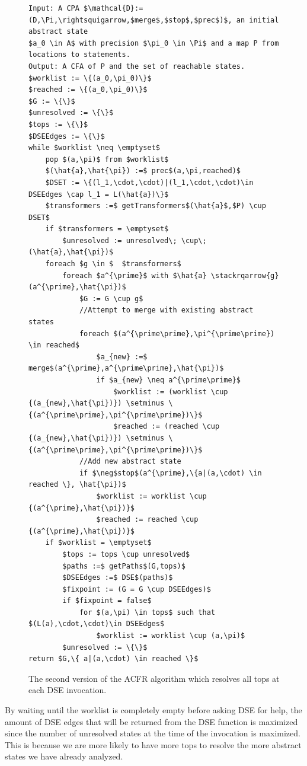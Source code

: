 \documentclass{kththesis}
\newcommand\stackrqarrow[1]{%
    \mathrel{\stackon[2pt]{$\rightsquigarrow$}{$\scriptscriptstyle#1$}}}
\begin{document}
\begin{figure}[htb]
    \centering
\begin{algorithmFrame}
\begin{lstlisting}[style=algorithm]
Input: A CPA $\mathcal{D}:=(D,\Pi,\rightsquigarrow,$merge$,$stop$,$prec$)$, an initial abstract state
$a_0 \in A$ with precision $\pi_0 \in \Pi$ and a map P from locations to statements.
Output: A CFA of P and the set of reachable states.
$worklist := \{(a_0,\pi_0)\}$
$reached := \{(a_0,\pi_0)\}$
$G := \{\}$
$unresolved := \{\}$
$tops := \{\}$
$DSEEdges := \{\}$
while $worklist \neq \emptyset$ 
    pop $(a,\pi)$ from $worklist$
    $(\hat{a},\hat{\pi}) :=$ prec$(a,\pi,reached)$
    $DSET := \{(l_1,\cdot,\cdot)|(l_1,\cdot,\cdot)\in DSEEdges \cap l_1 = L(\hat{a})\}$
    $transformers :=$ getTransformers$(\hat{a}$,$P) \cup DSET$
    if $transformers = \emptyset$
        $unresolved := unresolved\; \cup\; (\hat{a},\hat{\pi})$
    foreach $g \in $  $transformers$ 
        foreach $a^{\prime}$ with $\hat{a} \stackrqarrow{g} (a^{\prime},\hat{\pi})$
            $G := G \cup g$
            //Attempt to merge with existing abstract states
            foreach $(a^{\prime\prime},\pi^{\prime\prime}) \in reached$
                $a_{new} :=$ merge$(a^{\prime},a^{\prime\prime},\hat{\pi})$
                if $a_{new} \neq a^{\prime\prime}$
                    $worklist := (worklist \cup {(a_{new},\hat{\pi})}) \setminus \{(a^{\prime\prime},\pi^{\prime\prime})\}$
                    $reached := (reached \cup {(a_{new},\hat{\pi})}) \setminus \{(a^{\prime\prime},\pi^{\prime\prime})\}$
            //Add new abstract state
            if $\neg$stop$(a^{\prime},\{a|(a,\cdot) \in reached \}, \hat{\pi})$
                $worklist := worklist \cup {(a^{\prime},\hat{\pi})}$
                $reached := reached \cup {(a^{\prime},\hat{\pi})}$
    if $worklist = \emptyset$
        $tops := tops \cup unresolved$
        $paths :=$ getPaths$(G,tops)$
        $DSEEdges :=$ DSE$(paths)$
        $fixpoint := (G = G \cup DSEEdges)$
        if $fixpoint = false$
            for $(a,\pi) \in tops$ such that $(L(a),\cdot,\cdot)\in DSEEdges$
                $worklist := worklist \cup (a,\pi)$
        $unresolved := \{\}$
return $G,\{ a|(a,\cdot) \in reached \}$
\end{lstlisting}
\end{algorithmFrame}
\caption{The second version of the ACFR algorithm which resolves all tops at each DSE invocation.}
    \label{fig:ACFR2}
\end{figure}
\clearpage
\noindent
By waiting until the worklist is completely empty before asking DSE for help, the amount of DSE edges that will be returned from the DSE function is maximized since the number of unresolved states at the time of the invocation is maximized. This is because we are more likely to have more tops to resolve the more abstract states we have already analyzed.
\end{document}

